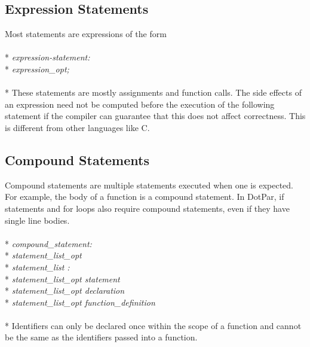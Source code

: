 \documentclass[11pt]{article}
\newcommand{\tab}{\hspace*{2em}}
\begin{document}
\subsection{Expression Statements}
Most statements are expressions of the form
\\ \\* \tab \emph{expression-statement:}
\\* \tab \tab \emph{expression\_opt;}
\\ \\* These statements are mostly assignments and function calls. The side effects of an expression need not be computed before the execution of the following statement if the compiler can guarantee that this does not affect correctness. This is different from other languages like C.
\subsection{Compound Statements}
Compound statements are multiple statements executed when one is expected. For example, the body of a function is a compound statement. In DotPar, if statements and for loops also require compound statements, even if they have single line bodies.
\\ \\* \tab \emph{compound\_statement:}
\\* \tab \tab \emph{{ statement\_list\_opt }}
\\* \tab \emph{statement\_list :}
\\* \tab \tab \emph{statement\_list\_opt statement}
\\* \tab \tab \emph{statement\_list\_opt declaration}
\\* \tab \tab \emph{statement\_list\_opt function\_definition}
\\ \\* Identifiers can only be declared once within the scope of a function and cannot be the same as the identifiers passed into a function.
\end{document}
